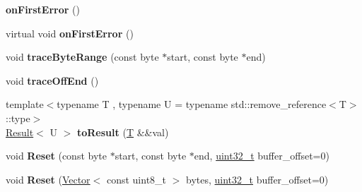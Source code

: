\begin{DoxyCompactItemize}
\item 
\mbox{\label{classv8_1_1internal_1_1wasm_1_1Decoder_aba7b54baf435f42604176ba1e77796e2}} 
{\bfseries on\+First\+Error} ()
\item 
\mbox{\label{classv8_1_1internal_1_1wasm_1_1Decoder_aecc70395d14265ed24c24789fe207e54}} 
virtual void {\bfseries on\+First\+Error} ()
\item 
\mbox{\label{classv8_1_1internal_1_1wasm_1_1Decoder_a474b68d30a3c3ce98d621ff780b418ef}} 
void {\bfseries trace\+Byte\+Range} (const byte $\ast$start, const byte $\ast$end)
\item 
\mbox{\label{classv8_1_1internal_1_1wasm_1_1Decoder_a1ae9f268dad0f1ff00300d571351e819}} 
void {\bfseries trace\+Off\+End} ()
\item 
\mbox{\label{classv8_1_1internal_1_1wasm_1_1Decoder_ae6bc9c143100fabbf4653875962dc785}} 
{\footnotesize template$<$typename T , typename U  = typename std\+::remove\+\_\+reference$<$\+T$>$\+::type$>$ }\\\mbox{\hyperlink{classv8_1_1internal_1_1wasm_1_1Result}{Result}}$<$ U $>$ {\bfseries to\+Result} (\mbox{\hyperlink{classv8_1_1internal_1_1torque_1_1T}{T}} \&\&val)
\item 
\mbox{\label{classv8_1_1internal_1_1wasm_1_1Decoder_ac708ace0dc28787277f55d9e9e468890}} 
void {\bfseries Reset} (const byte $\ast$start, const byte $\ast$end, \mbox{\hyperlink{classuint32__t}{uint32\+\_\+t}} buffer\+\_\+offset=0)
\item 
\mbox{\label{classv8_1_1internal_1_1wasm_1_1Decoder_aaa443c80b55795e3d271a251249108c7}} 
void {\bfseries Reset} (\mbox{\hyperlink{classv8_1_1internal_1_1Vector}{Vector}}$<$ const uint8\+\_\+t $>$ bytes, \mbox{\hyperlink{classuint32__t}{uint32\+\_\+t}} buffer\+\_\+offset=0)
\item 
\mbox{\label{classv8_1_1internal_1_1wasm_1_1Decoder_ad841346d61b24c36aec8c6e81ed69ec2}} 

\end{DoxyCompactItemize}
